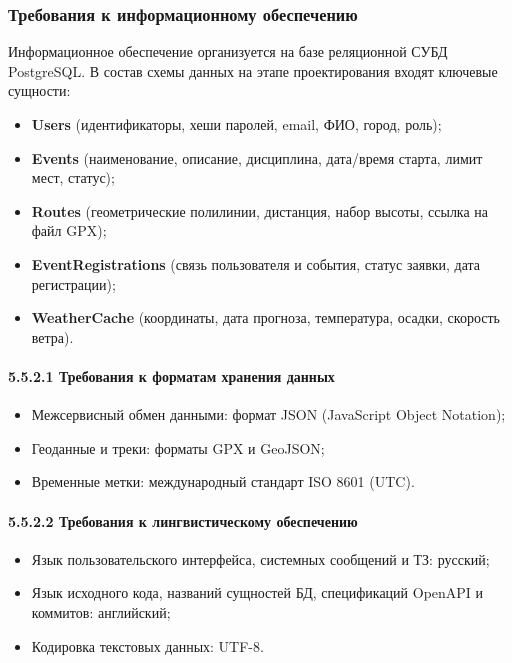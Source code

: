 \documentclass[a4paper,12pt]{article}
\begin{document}
\subsubsection{Требования к информационному обеспечению}
Информационное обеспечение организуется на базе реляционной СУБД PostgreSQL.
В состав схемы данных на этапе проектирования входят ключевые сущности:
\begin{itemize}
	\item \textbf{Users} (идентификаторы, хеши паролей, email, ФИО, город, роль);
	\item \textbf{Events} (наименование, описание, дисциплина, дата/время старта, лимит мест, статус);
	\item \textbf{Routes} (геометрические полилинии, дистанция, набор высоты, ссылка на файл GPX);
	\item \textbf{EventRegistrations} (связь пользователя и события, статус заявки, дата регистрации);
	\item \textbf{WeatherCache} (координаты, дата прогноза, температура, осадки, скорость ветра).
\end{itemize}

\paragraph{5.5.2.1 Требования к форматам хранения данных}
\begin{itemize}
	\item Межсервисный обмен данными: формат JSON (JavaScript Object Notation);
	\item Геоданные и треки: форматы GPX и GeoJSON;
	\item Временные метки: международный стандарт ISO 8601 (UTC).
\end{itemize}

\paragraph{5.5.2.2 Требования к лингвистическому обеспечению}
\begin{itemize}
	\item Язык пользовательского интерфейса, системных сообщений и ТЗ: русский;
	\item Язык исходного кода, названий сущностей БД, спецификаций OpenAPI и коммитов: английский;
	\item Кодировка текстовых данных: UTF-8.
\end{itemize}
\end{document}
